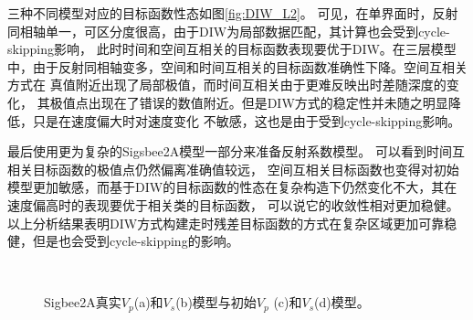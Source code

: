 三种不同模型对应的目标函数性态如图\ref{fig:DIW_L2}。
可见，在单界面时，反射同相轴单一，可区分度很高，由于DIW为局部数据匹配，其计算也会受到cycle-skipping影响，
此时时间和空间互相关的目标函数表现要优于DIW。在三层模型中，由于反射同相轴变多，空间和时间互相关的目标函数准确性下降。空间互相关方式在
真值附近出现了局部极值，而时间互相关由于更难反映出时差随深度的变化，
其极值点出现在了错误的数值附近。但是DIW方式的稳定性并未随之明显降低，只是在速度偏大时对速度变化
不敏感，这也是由于受到cycle-skipping影响。

最后使用更为复杂的Sigsbee2A模型一部分来准备反射系数模型。
可以看到时间互相关目标函数的极值点仍然偏离准确值较远，
空间互相关目标函数也变得对初始模型更加敏感，而基于DIW的目标函数的性态在复杂构造下仍然变化不大，其在速度偏高时的表现要优于相关类的目标函数，
可以说它的收敛性相对更加稳健。
以上分析结果表明DIW方式构建走时残差目标函数的方式在复杂区域更加可靠稳健，但是也会受到cycle-skipping的影响。

\begin{figure}[!htb]
   \centering
   \\
   \caption{Sigbee2A真实$V_p$(a)和$V_s$(b)模型与初始$V_p$ (c)和$V_s$(d)模型。}
   \label{fig:TrueAndInitial}
\end{figure}
